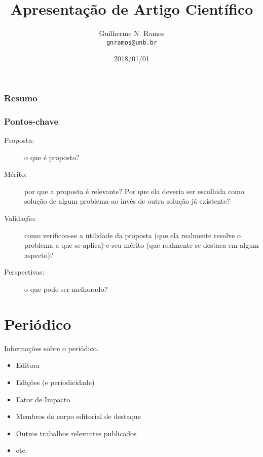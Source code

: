 \documentclass{UnBeamer}%
\title[Resumo]{Apresentação de Artigo Científico}%
\author[gnramos]{Guilherme N. Ramos\\%
                 \texttt{gnramos@unb.br}}%
\institute[PPCA/CIC]{Departamento de Ciência da Computação\\%
                     Universidade de Brasília}%
\date[2018]{2018/01/01}%
\begin{document}
%
    \frame{\titlepage}%

    \begin{frame}%
        \frametitle{Resumo}%
        \tableofcontents%
    \end{frame}%

    \begin{frame}%
        \frametitle{Pontos-chave}%

        \begin{description}
            \item[Proposta:] o que é proposto?\vfill%
            \item[Mérito:] por que a proposta é relevante? Por que ela deveria ser escolhida como solução de algum problema ao invés de outra solução já existente?\vfill%
            \item[Validação:] como verificou-se a utilidade da proposta (que ela realmente resolve o problema a que se aplica) e seu mérito (que realmente se destaca em algum aspecto)?\vfill%
            \item[Perspectivas:] o que pode ser melhorado?%
        \end{description}%
    \end{frame}%

    \section{Periódico}
    \begin{frame}%
        Informações sobre o periódico.%
        \begin{itemize}%
            \item Editora%
            \item Edições (e periodicidade)%
            \item Fator de Impacto%
            \item Membros do corpo editorial de destaque%
            \item Outros trabalhos relevantes publicados%
            \item etc.%
        \end{itemize}%
    \end{frame}%
\end{document}
